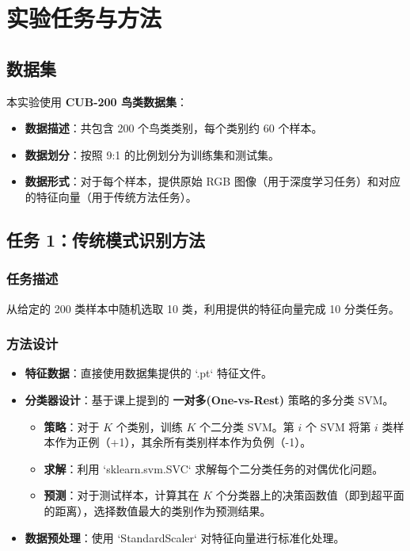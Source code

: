 \documentclass[UTF8]{ctexart}
\begin{document}
\section{实验任务与方法}

\subsection{数据集}
本实验使用 \textbf{CUB-200 鸟类数据集}：
\begin{itemize}
    \item \textbf{数据描述}：共包含 200 个鸟类类别，每个类别约 60 个样本。
    \item \textbf{数据划分}：按照 9:1 的比例划分为训练集和测试集。
    \item \textbf{数据形式}：对于每个样本，提供原始 RGB 图像（用于深度学习任务）和对应的特征向量（用于传统方法任务）。
\end{itemize}

\subsection{任务 1：传统模式识别方法}
\subsubsection{任务描述}
从给定的 200 类样本中随机选取 10 类，利用提供的特征向量完成 10 分类任务。

\subsubsection{方法设计}
\begin{itemize}
    \item \textbf{特征数据}：直接使用数据集提供的 `.pt` 特征文件。
    \item \textbf{分类器设计}：基于课上提到的 \textbf{一对多(One-vs-Rest)} 策略的多分类 SVM。
    \begin{itemize}
        \item \textbf{策略}：对于 $K$ 个类别，训练 $K$ 个二分类 SVM。第 $i$ 个 SVM 将第 $i$ 类样本作为正例（+1），其余所有类别样本作为负例（-1）。
        \item \textbf{求解}：利用 `sklearn.svm.SVC` 求解每个二分类任务的对偶优化问题。
        \item \textbf{预测}：对于测试样本，计算其在 $K$ 个分类器上的决策函数值（即到超平面的距离），选择数值最大的类别作为预测结果。
    \end{itemize}
    \item \textbf{数据预处理}：使用 `StandardScaler` 对特征向量进行标准化处理。
\end{itemize}
\end{document}
